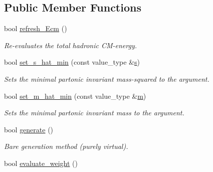 \subsection*{Public Member Functions}
\begin{DoxyCompactItemize}
\item 
\hypertarget{a00259_a0660be3ee1baa2f0cfdef7c4204743f4}{}bool \hyperlink{a00259_a0660be3ee1baa2f0cfdef7c4204743f4}{refresh\+\_\+\+Ecm} ()\label{a00259_a0660be3ee1baa2f0cfdef7c4204743f4}

\begin{DoxyCompactList}\small\item\em Re-\/evaluates the total hadronic C\+M-\/energy. \end{DoxyCompactList}\item 
\hypertarget{a00259_a5980930205dfaaeddb34719541a2018c}{}bool \hyperlink{a00259_a5980930205dfaaeddb34719541a2018c}{set\+\_\+s\+\_\+hat\+\_\+min} (const value\+\_\+type \&\hyperlink{a00308_ae2984255cbdaabc293b8168d93c767bf}{s})\label{a00259_a5980930205dfaaeddb34719541a2018c}

\begin{DoxyCompactList}\small\item\em Sets the minimal partonic invariant mass-\/squared to the argument. \end{DoxyCompactList}\item 
\hypertarget{a00259_a88cc3f829804e6624e95de9bac2c17b0}{}bool \hyperlink{a00259_a88cc3f829804e6624e95de9bac2c17b0}{set\+\_\+m\+\_\+hat\+\_\+min} (const value\+\_\+type \&\hyperlink{a00308_a2a95cea4e7fd1e59bf96fed7225afdf2}{m})\label{a00259_a88cc3f829804e6624e95de9bac2c17b0}

\begin{DoxyCompactList}\small\item\em Sets the minimal partonic invariant mass to the argument. \end{DoxyCompactList}\item 
bool \hyperlink{a00259_a98f349a841c9177ead3c3d84d4262eee}{generate} ()
\begin{DoxyCompactList}\small\item\em \textquotesingle{}Bare generation\textquotesingle{} method (purely virtual). \end{DoxyCompactList}\item 
\hypertarget{a00259_a5557622ee98578b1f93d7d9c312c5416}{}bool \hyperlink{a00259_a5557622ee98578b1f93d7d9c312c5416}{evaluate\+\_\+weight} ()\label{a00259_a5557622ee98578b1f93d7d9c312c5416}


\end{DoxyCompactItemize}

